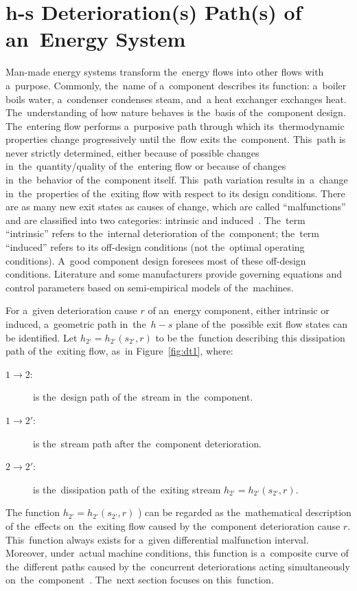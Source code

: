 \documentclass[energies,article,accept,moreauthors,pdftex]{Definitions/mdpi}
\begin{document}
\section{h-s Deterioration(s) Path(s) of an~Energy System}
Man-made energy systems transform the~energy flows into other flows with a~purpose. Commonly, the~name of a~component describes its function: a~boiler boils water, a~condenser condenses steam, and~a heat exchanger exchanges heat. The~understanding of how nature behaves is the~basis of the~component design. The~entering flow performs a~purposive path through which its~thermodynamic properties change progressively until the~flow exits the~component. This~path is never strictly determined, either because of possible changes in~the~quantity/quality of the~entering flow or because of changes in~the~behavior of the~component itself. This~path variation results in~a~change in~the~properties of the~exiting flow with respect to its design conditions. There are as many new exit states as causes of change, which are called “malfunctions” and are classified into two categories: intrinsic and induced~\cite{Valero2004c,Valero1999c,Torres1999}. The~term “intrinsic” refers to the~internal deterioration of the~component; the~term “induced” refers to its off-design conditions (not the~optimal operating conditions). A~good component design foresees most of these off-design conditions. Literature and some manufacturers provide governing equations and control parameters based on semi-empirical models of the~machines.

For a~given deterioration cause $r$ of an~energy component, either intrinsic or induced, a~geometric path in~the~$h-s$ plane of the~possible exit flow states can be identified. Let $h_{2'}=h_{2'}(s_{2'}, r)$ to be the~function describing this dissipation path of the~exiting flow, as~in Figure~\ref{fig:dt1}, where:

\begin{description}
	\item[$1 \longrightarrow 2:$]  is the~design path of the~stream in~the~component.
	\item[$1 \longrightarrow 2':$] is the~stream path after the~component deterioration.
	\item[$2 \longrightarrow 2':$] is the~dissipation path of the~exiting stream $h_{2'} = h_{2'} (s_{2'}, r).$
\end{description}

The function $h_{2'}=h_{2'} (s_{2'}, r)$ ) can be regarded as the~mathematical description of the~effects on~the~exiting flow caused by the~component deterioration cause $r$. This~function always exists for a~given differential malfunction interval. Moreover, under~actual machine conditions, this function is a~composite curve of the~different paths caused by the~concurrent deteriorations acting simultaneously on~the~component~\cite{Valero2004c}. The~next section focuses on this~function.
\end{document}
